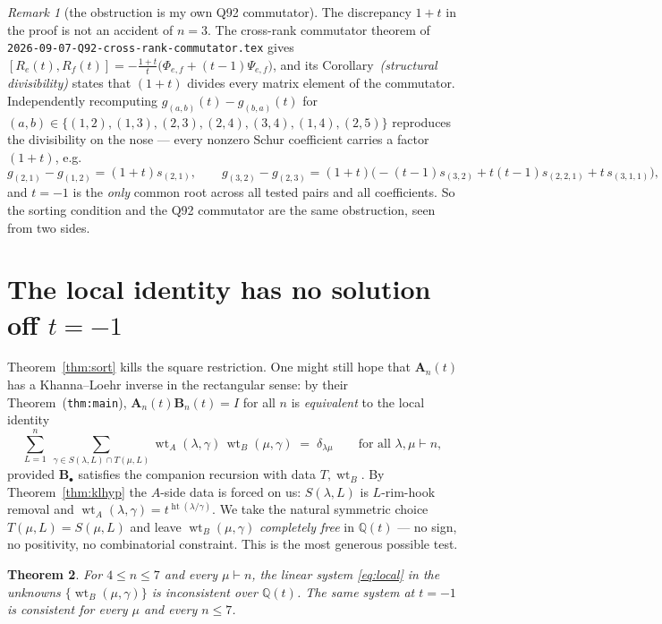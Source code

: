 \documentclass[11pt]{article}
\newtheorem{theorem}{Theorem}[section]
\theoremstyle{definition}
\theoremstyle{remark}
\newtheorem{remark}[theorem]{Remark}
\newcommand{\Q}{\mathbb{Q}}
\newcommand{\hgt}{\operatorname{ht}}
\newcommand{\wtA}{\operatorname{wt}_A}
\newcommand{\wtB}{\operatorname{wt}_B}
\newcommand{\Amat}{\mathbf{A}}
\newcommand{\Bmat}{\mathbf{B}}
\begin{document}
\begin{remark}[the obstruction is my own Q92 commutator]
The discrepancy $1+t$ in the proof is not an accident of $n=3$.  The cross-rank commutator theorem of
\texttt{2026-09-07-Q92-cross-rank-commutator.tex} gives
$[R_e(t),R_f(t)]=-\tfrac{1+t}{t}\bigl(\Phi_{e,f}+(t-1)\Psi_{e,f}\bigr)$, and its
Corollary~\emph{(structural divisibility)} states that $(1+t)$ divides every matrix element of
the commutator.  Independently recomputing $g_{(a,b)}(t)-g_{(b,a)}(t)$ for
$(a,b)\in\{(1,2),(1,3),(2,3),(2,4),(3,4),(1,4),(2,5)\}$ reproduces the divisibility on the
nose --- every nonzero Schur coefficient carries a factor $(1+t)$, e.g.
\[
 g_{(2,1)}-g_{(1,2)}=(1+t)s_{(2,1)},\qquad
 g_{(3,2)}-g_{(2,3)}=(1+t)\bigl(-(t-1)s_{(3,2)}+t(t-1)s_{(2,2,1)}+t\,s_{(3,1,1)}\bigr),
\]
and $t=-1$ is the \emph{only} common root across all tested pairs and all coefficients.
So the sorting condition and the Q92 commutator are the same obstruction, seen from two
sides.
\end{remark}

\section{The local identity has no solution off $t=-1$}\label{sec:local}

Theorem~\ref{thm:sort} kills the square restriction.  One might still hope that
$\Amat_n(t)$ has a Khanna--Loehr inverse in the rectangular sense: by their
Theorem~(\texttt{thm:main}), $\Amat_n(t)\Bmat_n(t)=I$ for all $n$ is \emph{equivalent} to the
local identity
\begin{equation}\label{eq:local}
  \sum_{L=1}^{n}\ \sum_{\gamma\in S(\lambda,L)\cap T(\mu,L)}
     \wtA(\lambda,\gamma)\,\wtB(\mu,\gamma)\;=\;\delta_{\lambda\mu}
  \qquad\text{for all }\lambda,\mu\vdash n,
\end{equation}
provided $\Bmat_\bullet$ satisfies the companion recursion with data $T,\wtB$.  By
Theorem~\ref{thm:klhyp} the $A$-side data is forced on us:
$S(\lambda,L)$ is $L$-rim-hook removal and $\wtA(\lambda,\gamma)=t^{\hgt(\lambda/\gamma)}$.
We take the natural symmetric choice $T(\mu,L)=S(\mu,L)$ and leave $\wtB(\mu,\gamma)$
\emph{completely free} in $\Q(t)$ --- no sign, no positivity, no combinatorial constraint.
This is the most generous possible test.

\begin{theorem}\label{thm:local}
For $4\le n\le7$ and \emph{every} $\mu\vdash n$, the linear system \eqref{eq:local} in the
unknowns $\{\wtB(\mu,\gamma)\}$ is inconsistent over $\Q(t)$.  The same system at $t=-1$ is
consistent for every $\mu$ and every $n\le7$.
\end{theorem}
\end{document}

